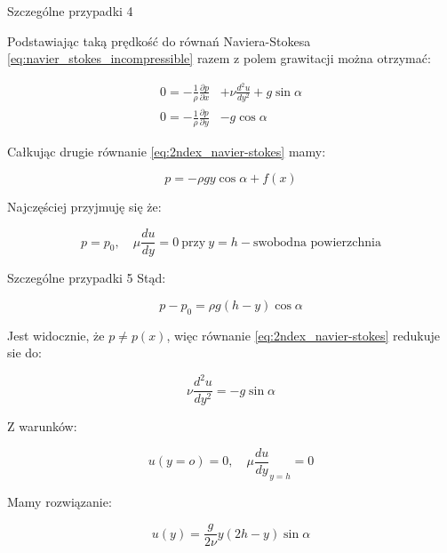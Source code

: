 \documentclass{beamer}
\begin{document}
\begin{frame}{Szczególne przypadki 4}

	Podstawiając taką prędkość do równań Naviera-Stokesa \eqref{eq:navier_stokes_incompressible}
	razem z polem grawitacji można otrzymać:

	\begin{equation}
		\begin{split}
			0 = -\frac{1}{\rho} \frac{\partial p}{\partial x} & +\nu \frac{d^2u}{dy^2}  + g \sin \alpha\\
			0 = -\frac{1}{\rho} \frac{\partial p}{\partial y}  & - g \cos \alpha
			\end{split}
		\label{eq:2ndex_navier-stokes}
	\end{equation}

	Całkując drugie równanie \eqref{eq:2ndex_navier-stokes} mamy:

	\begin{equation}
		p = -\rho g y \cos \alpha + f(x)
	\label{eq:2ndex_pressure_undefined}
	\end{equation}

	Najczęściej przyjmuję się że:

	\begin{equation}
		p=p_0, \quad \mu\frac{du}{dy} = 0\ \text{przy}\ y=h - \text{swobodna powierzchnia}
	\label{eq:2ndex_pressure_bc}
	\end{equation}
\end{frame}

\begin{frame}{Szczególne przypadki 5}
	Stąd:
	
	\begin{equation}
		p - p_0 = \rho g (h-y) \cos \alpha
	\label{eq:2ndex_pressure_defined}
	\end{equation}

	Jest widocznie, że $p\neq p(x)$, więc równanie \eqref{eq:2ndex_navier-stokes}
	redukuje sie do:

	\begin{equation}
		\nu \frac{d^2u}{dy^2} = -g \sin \alpha
	\label{eq:2ndex_navier-stokes_reduced}
	\end{equation}
	
	Z warunków:

	\begin{equation}
		u(y=o) = 0, \quad \mu \frac{du}{dy}_{y=h} = 0
	\label{eq:2ndex_velocity_bc}
	\end{equation}

	Mamy rozwiązanie:

	\begin{equation}
		u(y) = \frac{g}{2\nu} y (2h-y) \sin \alpha
	\label{eq:2ndex_velocity_solution}
	\end{equation}
\end{frame}
\end{document}
